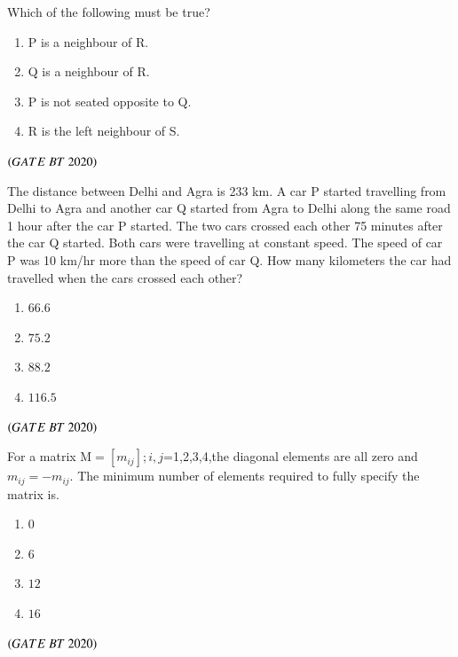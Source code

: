 \documentclass[journal,12pt,onecolumn]{IEEEtran}
\theoremstyle{remark}
\begin{document}
Which of the following must be true?
\begin{multicols}{2}
 \begin{enumerate}

\item\;P is a neighbour of R.
\item\;Q is a neighbour of R.
\item\;P is not seated opposite to Q.
\item\;R is the left neighbour of S.

\end{enumerate}
\end{multicols}
\hfill$\left(GATE\ BT\ 2020\right)$

\item The distance between Delhi and Agra is 233 km. A car P started travelling from Delhi to Agra and another car Q started from Agra to Delhi along the same road 1 hour after the car P started. The two cars crossed each other 75 minutes after the car Q started. Both cars were travelling at constant speed. The speed of car P was 10 km/hr more than the speed of car Q. How many kilometers the car had travelled when the cars crossed each other?
\begin{multicols}{4}
\begin{enumerate}
\item\;$66.6$
\item\;$75.2$
\item\;$88.2$
\item\;$116.5$
\end{enumerate}
\end{multicols}
\hfill$\left(GATE\ BT\ 2020\right)$

\item  For a matrix M$=$${[m_{ij}]}$$;i,j$=1,2,3,4,the diagonal elements are all zero and ${m_{ij}}=-$${m_{ij}}$. The minimum number of elements required to fully specify the matrix is.
\begin{multicols}{4}
\begin{enumerate}

\item\;$0$
\item\;$6$
\item\;$12$
\item\;$16$

\end{enumerate} 
\end{multicols}\hfill$\left(GATE\ BT\ 2020\right)$\\
\end{document}
